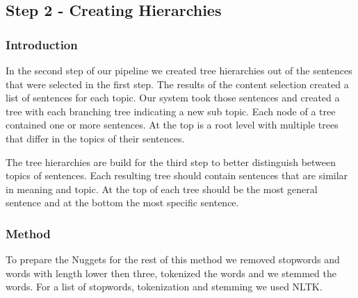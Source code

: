 



\subsection{Step 2 - Creating Hierarchies}

\subsubsection{Introduction}

In the second step of our pipeline we created tree hierarchies out of the sentences that were selected in the first step. The results of the content selection created a list of sentences for each topic. Our system took those sentences and created a tree with each branching tree indicating a new sub topic. Each node of a tree contained one or more sentences. At the top is a root level with multiple trees that differ in the topics of their sentences. 

The tree hierarchies are build for the third step to better distinguish between topics of sentences. Each resulting tree should contain sentences that are similar in meaning and topic. At the top of each tree should be the most general sentence and at the bottom the most specific sentence.


\subsubsection{Method}

To prepare the Nuggets for the rest of this method we removed stopwords and words with length lower then three, tokenized the words and we stemmed the words. For a list of stopwords, tokenization and stemming we used NLTK.


